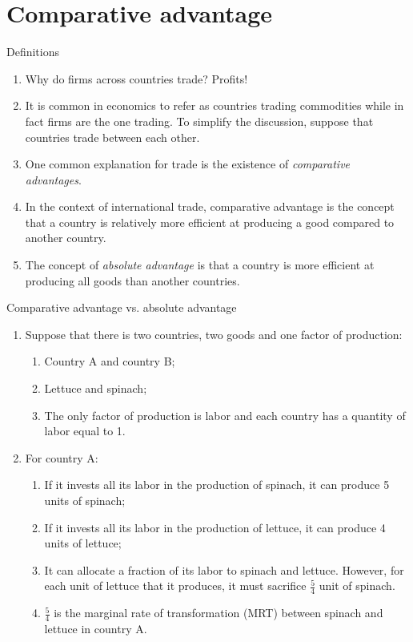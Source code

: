 \documentclass[table,xcolor=pdftex,dvipsnames]{beamer}\usepackage[]{graphicx}\usepackage[]{color}
\begin{document}
\section{Comparative advantage}

\begin{frame}{Definitions}
\begin{enumerate}[label=\textbullet]
  \item Why do firms across countries trade? Profits!
  \item It is common in economics to refer as countries trading commodities while in fact firms are the one trading. To simplify the discussion, suppose that countries trade between each other.
  \item One common explanation for trade is the existence of \emph{comparative advantages}.
  \item In the context of international trade, comparative advantage is the concept that a country is relatively more efficient at producing a good compared to another country.
  \item The concept of \emph{absolute advantage} is that a country is more efficient at producing all goods than another countries.
\end{enumerate}
\end{frame}



\begin{frame}{Comparative advantage vs. absolute advantage}
\begin{enumerate}[label=\textbullet]
  \item Suppose that there is two countries, two goods and one factor of production:
      \begin{enumerate}[label=-]
          \item Country A and country B;
          \item Lettuce and spinach;
          \item The only factor of production is labor and each country has a quantity of labor equal to 1.
      \end{enumerate}
  \item For country A:
      \begin{enumerate}[label=-]
          \item If it invests all its labor in the production of spinach, it can produce 5 units of spinach;
          \item If it invests all its labor in the production of lettuce, it can produce 4 units of lettuce;
          \item It can allocate a fraction of its labor to spinach and lettuce. However, for each unit of lettuce that it produces, it must sacrifice $\frac{5}{4}$ unit of spinach.
          \item $\frac{5}{4}$ is the marginal rate of transformation (MRT) between spinach and lettuce in country A.
      \end{enumerate}

\end{enumerate}
\end{frame}
\end{document}
